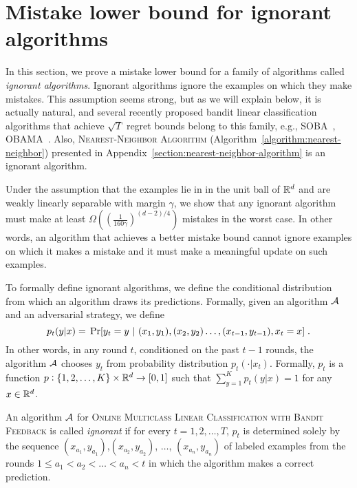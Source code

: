 \section{Mistake lower bound for ignorant algorithms}
\label{section:mistake-lower-bound-for-ignorant-algorithms}

In this section, we prove a mistake lower bound for a family of algorithms
called \textit{ignorant algorithms}. Ignorant algorithms ignore the examples on
which they make mistakes. This assumption seems strong, but as we will explain
below, it is actually natural, and several recently proposed bandit linear
classification algorithms that achieve $\sqrt{T}$ regret bounds belong to this
family, e.g., SOBA~\citep{Beygelzimer-Orabona-Zhang-2017},
OBAMA~\citep{Foster-Kale-Luo-Mohri-Sridharan-2018}. Also,
\textsc{Nearest-Neighbor Algorithm} (Algorithm~\ref{algorithm:nearest-neighbor})
presented in Appendix~\ref{section:nearest-neighbor-algorithm} is an ignorant
algorithm.

Under the assumption that the examples lie in in the unit ball of $\mathbb{R}^d$ and are
weakly linearly separable with margin $\gamma$, we show that any ignorant
algorithm must make at least $\Omega \left( \left(\frac{1}{160
\gamma}\right)^{(d-2)/4} \right)$ mistakes in the worst case. In other words, an
algorithm that achieves a better mistake bound cannot ignore examples on which
it makes a mistake and it must make a meaningful update on such examples.

To formally define ignorant algorithms, we define the conditional distribution
from which an algorithm draws its predictions. Formally, given an algorithm
$\mathcal{A}$ and an adversarial strategy, we define
\[
p_t(y|x) = \\
\Pr[y_t = y ~|~ (x_1, y_1), (x_2, y_2) \dots, (x_{t-1}, y_{t-1}), x_t = x] \; .
\]
In other words, in any round $t$, conditioned on the past $t-1$ rounds, the
algorithm $\mathcal{A}$ chooses $y_t$ from probability distribution $p_t(\cdot|x_t)$.
Formally, $p_t$ is a function $p:\{1,2,\dots,K\} \times \mathbb{R}^d \to [0,1]$
such that $\sum_{y=1}^K p_t(y|x) = 1$ for any $x \in \mathbb{R}^d$.

\begin{definition}
An algorithm $\mathcal{A}$ for \textsc{Online Multiclass Linear Classification with
Bandit Feedback} is called \emph{ignorant} if for every $t=1,2,\dots,T$,
$p_t$ is determined solely by the sequence
$(x_{a_1}, y_{a_1})$,$(x_{a_2}, y_{a_2})$, $\dots$, $(x_{a_n}, y_{a_n})$
of labeled examples
from the rounds $1 \le a_1 < a_2 < \dots < a_n < t$ in which
the algorithm makes a correct prediction.
\end{definition}

